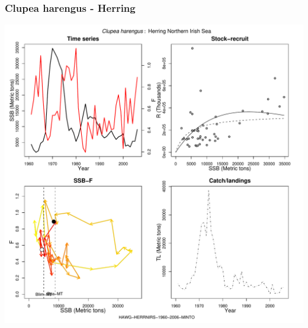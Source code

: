 \subsubsection{Clupea harengus - Herring}
\begin{center}
\includegraphics[width=1.2\textwidth]{../R/figures/HAWG-HERRNIRS-1960-2006-MINTO.pdf}
\end{center}

